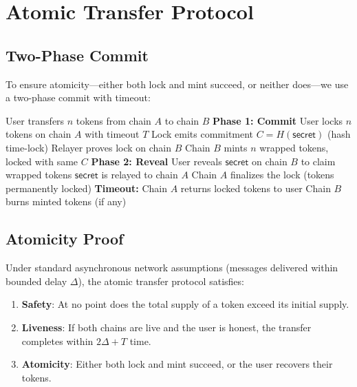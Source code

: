 \section{Atomic Transfer Protocol}
\label{sec:atomic}

\subsection{Two-Phase Commit}

To ensure atomicity---either both lock and mint succeed, or neither does---we use a two-phase commit with timeout:

\begin{algorithm}[H]
\caption{Atomic Interchain Transfer}
\label{alg:atomic}
\begin{algorithmic}[1]
\Require User transfers $n$ tokens from chain $A$ to chain $B$
\State \textbf{Phase 1: Commit}
\State User locks $n$ tokens on chain $A$ with timeout $T$
\State Lock emits commitment $C = H(\mathsf{secret})$ (hash time-lock)
\State Relayer proves lock on chain $B$
\State Chain $B$ mints $n$ wrapped tokens, locked with same $C$
\State \textbf{Phase 2: Reveal}
\State User reveals $\mathsf{secret}$ on chain $B$ to claim wrapped tokens
\State $\mathsf{secret}$ is relayed to chain $A$
\State Chain $A$ finalizes the lock (tokens permanently locked)
\State \textbf{Timeout:}
    \State Chain $A$ returns locked tokens to user
    \State Chain $B$ burns minted tokens (if any)
\EndIf
\end{algorithmic}
\end{algorithm}

\subsection{Atomicity Proof}

\begin{theorem}
Under standard asynchronous network assumptions (messages delivered within bounded delay $\Delta$), the atomic transfer protocol satisfies:
\begin{enumerate}
    \item \textbf{Safety}: At no point does the total supply of a token exceed its initial supply.
    \item \textbf{Liveness}: If both chains are live and the user is honest, the transfer completes within $2\Delta + T$ time.
    \item \textbf{Atomicity}: Either both lock and mint succeed, or the user recovers their tokens.
\end{enumerate}
\end{theorem}

